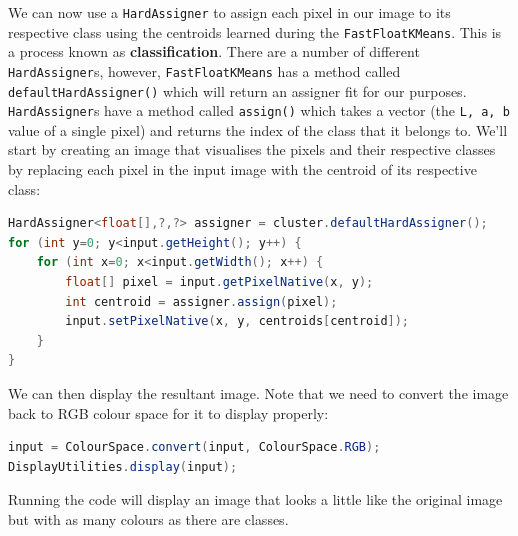 We can now use a \verb+HardAssigner+ to assign each pixel in our image to its respective 
class using the centroids learned during the \verb+FastFloatKMeans+. This is a process known as \textbf{classification}. There are a number of different \verb+HardAssigner+s, however, \verb+FastFloatKMeans+ has a method called \verb+defaultHardAssigner()+ which will return an assigner fit for our purposes. \verb+HardAssigner+s have a method called \verb+assign()+ which takes a vector (the \verb+L, a, b+ value of a single pixel) and 
returns the index of the class that it belongs to. We'll start by creating an image that 
visualises the pixels and their respective classes by replacing each pixel in the input image 
with the centroid of its respective class:
\begin{lstlisting}[language=java]
HardAssigner<float[],?,?> assigner = cluster.defaultHardAssigner();
for (int y=0; y<input.getHeight(); y++) {
    for (int x=0; x<input.getWidth(); x++) {
        float[] pixel = input.getPixelNative(x, y);
        int centroid = assigner.assign(pixel);
        input.setPixelNative(x, y, centroids[centroid]);
    }
}
\end{lstlisting}
We can then display the resultant image. Note that we need to convert the image back to RGB 
colour space for it to display properly:
\begin{lstlisting}[language=java]
input = ColourSpace.convert(input, ColourSpace.RGB);
DisplayUtilities.display(input);
\end{lstlisting}
Running the code will display an image that looks a little like the original image but with 
as many colours as there are classes. 


